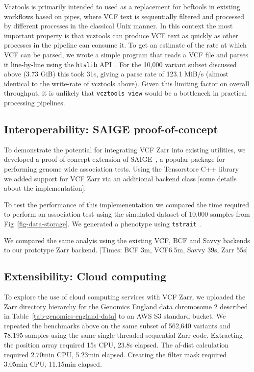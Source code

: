 \documentclass[a4paper,num-refs]{oup-contemporary}
\begin{document}
Vcztools is primarily intended to used as a replacement for bcftools
in existing workflows based on pipes, where VCF text is sequentially
filtered and processed by different processes in the classical
Unix manner. In this context the most important property is that vcztools
can produce VCF text as quickly as other processes in the pipeline can consume
it. To get an estimate of the rate at which VCF can be parsed, we wrote a simple
program that reads a VCF file and parses it line-by-line using the \texttt{htslib}
API~\citep{bonfield2021htslib}. For the 10,000 variant subset discussed
above (3.73 GiB) this took 31s, giving a parse rate of 123.1 MiB/s
(almost identical to the write-rate of vcztools above). Given this limiting
factor on overall throughput,
it is unlikely that \texttt{vcztools view} would be a bottleneck
in practical processing pipelines.

\subsection{Interoperability: SAIGE proof-of-concept}
To demonstrate the potential for integrating VCF Zarr into existing utilities,
we developed a proof-of-concept extension of SAIGE~\cite{zhou2018efficiently,
zhou2020scalable}, a popular package for performing genome wide
association tests. Using the Tensorstore C++ library~\cite{tensorstore}
we added support for VCF Zarr via an additional backend class [some details
about the implementation].

To test the performance of this implemenentation we compared the time required
to perform an association test using the simulated dataset of 10,000 samples
from Fig~\ref{fig-data-storage}. We generated a phenotype using
\texttt{tstrait}~\citep{tagami2024tstrait}.

We compared the same analyis using the existing VCF, BCF and Savvy backends
to our prototype Zarr backend.
[Times: BCF 3m, VCF6.5m, Savvy 39s, Zarr 55s]






\subsection{Extensibility: Cloud computing}
To explore the use of cloud computing services with VCF Zarr,
we uploaded the Zarr directory hierarchy for the Genomics England
data chromosome 2 described in Table~\ref{tab-genomics-england-data}
to an AWS S3 standard bucket. 
We repeated the benchmarks above on the same subset
of 562,640 variants and 78,195 samples using the same
single-threaded sequential Zarr code.
Extracting the position array required 15s CPU, 23.8s elapsed.
The af-dist calculation required 2.70min CPU, 5.23min elapsed.
Creating the filter mask required 3.05min CPU, 11.15min elapsed.
\end{document}
